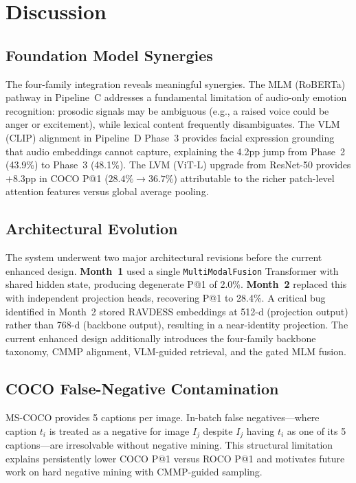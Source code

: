 \documentclass[10pt,conference]{IEEEtran}
\theoremstyle{ieeethm}
\theoremstyle{ieeedef}
\theoremstyle{ieeeremark}
\begin{document}
\section{Discussion}
\label{sec:discussion}

\subsection{Foundation Model Synergies}

The four-family integration reveals meaningful synergies. The MLM (RoBERTa) pathway in Pipeline~C addresses a fundamental limitation of audio-only emotion recognition: prosodic signals may be ambiguous (e.g., a raised voice could be anger or excitement), while lexical content frequently disambiguates. The VLM (CLIP) alignment in Pipeline~D Phase~3 provides facial expression grounding that audio embeddings cannot capture, explaining the 4.2pp jump from Phase~2 (43.9\%) to Phase~3 (48.1\%). The LVM (ViT-L) upgrade from ResNet-50 provides $+8.3$pp in COCO P@1 ($28.4\% \to 36.7\%$) attributable to the richer patch-level attention features versus global average pooling.

\subsection{Architectural Evolution}

The system underwent two major architectural revisions before the current enhanced design. \textbf{Month~1} used a single \texttt{MultiModalFusion} Transformer with shared hidden state, producing degenerate P@1 of 2.0\%. \textbf{Month~2} replaced this with independent projection heads, recovering P@1 to 28.4\%. A critical bug identified in Month~2 stored RAVDESS embeddings at 512-d (projection output) rather than 768-d (backbone output), resulting in a near-identity projection. The current enhanced design additionally introduces the four-family backbone taxonomy, CMMP alignment, VLM-guided retrieval, and the gated MLM fusion.

\subsection{COCO False-Negative Contamination}

MS-COCO provides 5 captions per image. In-batch false negatives---where caption $t_i$ is treated as a negative for image $I_j$ despite $I_j$ having $t_i$ as one of its 5 captions---are irresolvable without negative mining. This structural limitation explains persistently lower COCO P@1 versus ROCO P@1 and motivates future work on hard negative mining with CMMP-guided sampling.
\end{document}
